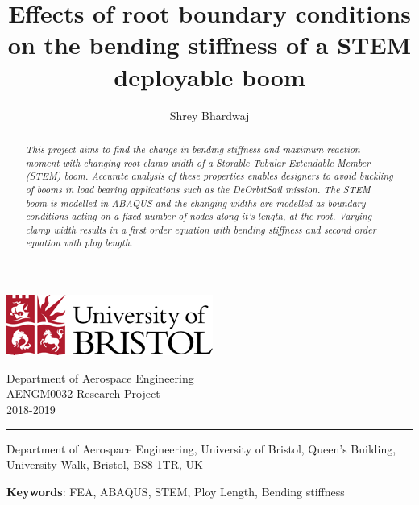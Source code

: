 \documentclass[11pt]{article}
\title{Effects of root boundary conditions on the bending stiffness of a STEM deployable boom}
\author{Shrey Bhardwaj}
\begin{document}
\thispagestyle{plain}

\vspace*{-2cm}

\begin{minipage}[t]{7cm}
\flushleft
\includegraphics{images/bristolLogo.png}
\end{minipage}
\hfill
\begin{minipage}[t]{7cm}
\flushright
\vspace*{-1cm}
Department of Aerospace Engineering\\
AENGM0032 Research Project\\
2018-2019
\end{minipage}

\vspace{11pt}
\hrule

\makeatletter
\begin{center}
	\vspace{11pt}
	\MakeUppercase{\textbf{\@title}}

	\@author

	Department of Aerospace Engineering, University of Bristol,
	Queen's Building, University Walk, Bristol, BS8 1TR, UK
\end{center}
\makeatother

\begin{abstract}{\it
This project aims to find the change in bending stiffness and maximum reaction moment with changing root clamp width of a Storable Tubular Extendable Member (STEM) boom. Accurate analysis of these properties enables designers to avoid buckling of booms in load bearing applications such as the DeOrbitSail mission. The STEM boom is modelled in ABAQUS and the changing widths are modelled as boundary conditions acting on a fixed number of nodes along it's length, at the root. Varying clamp width results in a first order equation with bending stiffness and second order equation with ploy length. 
}\end{abstract}

\begin{center}
	\textbf{Keywords}: FEA, ABAQUS, STEM, Ploy Length, Bending stiffness
\end{center}
	\tableofcontents
	\thispagestyle{empty}
	\newpage
	\listoffigures
    
    \newpage
	\setcounter{page}{1}    
    
    
    
    \newpage
    
    
    
    \small{
	
	
	}
	
	
\end{document}
